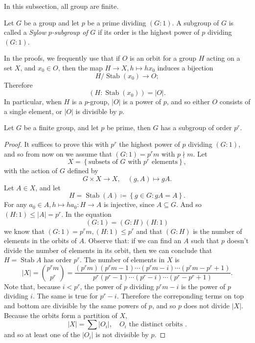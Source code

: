 In this subsection, all group are finite.
\begin{definition}
  \label{definition-Sylow-p-subgroup}
  Let \( G \) be a group and let \( p \) be a prime dividing \( (G: 1) \).
  A subgroup of \( G \) is called a \emph{Sylow} \emph{\( p \)-subgroup of} \( G \) if its order is the highest power of \( p \) dividing \( (G: 1) \).
\end{definition}


In the proofs, we frequently use that if \( O \) is an orbit for a group \( H \) acting on a set \( X \), and \( x_0 \in O \), then the map \( H \to X, h \mapsto h x_0 \) induces a bijection
\[
  H / \operatorname{Stab}(x_0) \to O;
\]
Therefore
\[
  (H: \operatorname{Stab}(x_0)) = \left\vert O \right\vert.
\]
In particular, when \( H \) is a \( p \)-group, \( \left\vert O \right\vert \) is a power of \( p \), and so either \( O \) consists of a single element, or \( \left\vert O \right\vert \) is divisible by \( p \).

\begin{theorem}[Sylow I]
  \label{theorem-sylow-I}
  Let \( G \) be a finite group, and let \( p \) be prime, then \( G \) has a subgroup of order \( p^r \).
\end{theorem}
\begin{proof}
  It suffices to prove this with \( p^r \) the highest power of \( p \) dividing \( (G : 1) \), and so from now on we assume that \( (G: 1) = p^r m \) with \( p \nmid m \).
  Let
  \[
    X = \left\lbrace \text{subsets of } G \text{ with } p^r \text{ elements} \right\rbrace,
  \]
  with the action of \( G \) defined by
  \[
    G \times X \to X,\quad (g, A) \mapsto gA.
  \]
  Let \( A \in X \), and let
  \[
    H = \operatorname{Stab}(A) \coloneq \left\lbrace g \in G: gA = A \right\rbrace.
  \]
  For any \( a_0 \in A, h \mapsto h a_0: H \to A \) is injective, since \( A \subseteq G \).
  And so \( (H : 1) \leq \left\vert A \right\vert = p^r \).
  In the equation
  \[
    (G : 1) = (G : H)(H : 1)
  \]
  we know that \( (G : 1) = p^r m, (H : 1) \leq p^r \) and that \( (G : H) \) is the number of elements in the orbits of \( A \).
  Observe that: if we can find an \( A \) such that \( p \) doesn't divide the number of elements in its orbit, then we can conclude that \( H = \operatorname{Stab}A \) has order \( p^r \).
  The number of elements in \( X \) is
  \[
    \left\vert X \right\vert = \binom{p^rm}{p^r} = \frac{(p^rm)(p^r m - 1) \cdots (p^rm- i) \cdots (p^rm - p^r + 1)}{p^r(p^r - 1) \cdots (p^r - i)\cdots (p^r - p^r + 1)}.
  \]
  Note that, because \( i < p^r \), the power of \( p \) dividing \( p^r m - i \) is the power of \( p \) dividing \( i \).
  The same is true for \( p^r - i \).
  Therefore the correponding terms on top and bottom are divisible by the same powers of \( p \), and so \( p \) does not divide \( \left\vert X \right\vert \).
  Because the orbits form a partition of \( X \),
  \[
    \left\vert X \right\vert = \sum \left\vert O_i \right\vert, \quad O_i\text{ the distinct orbits }.
  \]
  and so at least one of the \( \left\vert O_i \right\vert \) is not divisible by \( p \).
\end{proof}

